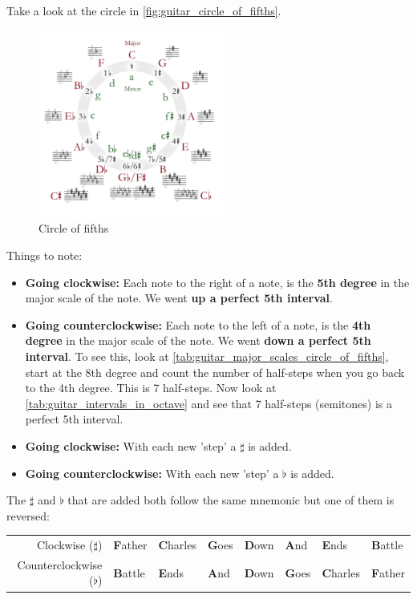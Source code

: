 Take a look at the circle in \autoref{fig:guitar_circle_of_fifths}.

\begin{figure}[h]
	\centering
	\includegraphics[width=0.55\textwidth]{../../Images/Circle_of_fifths_deluxe_4.svg.png}
	\caption{Circle of fifths \cite{CircleOfFifthsImageWikipedia}}
	\label{fig:guitar_circle_of_fifths}
\end{figure}

Things to note:
\begin{itemize}
	\item \textbf{Going clockwise:} Each note to the right of a note, is the \textbf{5th degree} in the major scale of the note. We went \textbf{up a perfect 5th interval}.
	\item \textbf{Going counterclockwise:} Each note to the left of a note, is the \textbf{4th degree} in the major scale of the note. We went \textbf{down a perfect 5th interval}. To see this, look at \autoref{tab:guitar_major_scales_circle_of_fifths}, start at the 8th degree and count the number of half-steps when you go back to the 4th degree. This is 7 half-steps. Now look at \autoref{tab:guitar_intervals_in_octave} and see that 7 half-steps (semitones) is a perfect 5th interval.
\end{itemize}

\begin{itemize}
	\item \textbf{Going clockwise:} With each new 'step' a $\sharp$ is added. 
	\item \textbf{Going counterclockwise:} With each new 'step' a $\flat$ is added.
\end{itemize}

The $\sharp$ and $\flat$ that are added both follow the same mnemonic but one of them is reversed:

\begin{table}[h]
	\centering
	\begin{NiceTabular}{r | l l l l l l l}
		Clockwise ($\sharp$) & \textbf{F}ather & \textbf{C}harles & \textbf{G}oes & \textbf{D}own & \textbf{A}nd & \textbf{E}nds & \textbf{B}attle \\
		Counterclockwise ($\flat$) & \textbf{B}attle & \textbf{E}nds & \textbf{A}nd & \textbf{D}own & \textbf{G}oes & \textbf{C}harles & \textbf{F}ather \\
	\end{NiceTabular}
\end{table}

